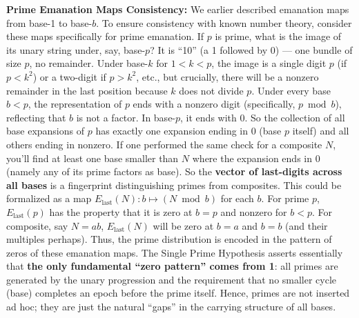 \documentclass{article}
\begin{document}
\textbf{Prime Emanation Maps Consistency:} We earlier described emanation maps from base-1 to base-$b$. To ensure consistency with known number theory, consider these maps specifically for prime emanation. If $p$ is prime, what is the image of its unary string under, say, base-$p$? It is ``10'' (a 1 followed by 0) --- one bundle of size $p$, no remainder. Under base-$k$ for $1<k<p$, the image is a single digit $p$ (if $p<k^2$) or a two-digit if $p>k^2$, etc., but crucially, there will be a nonzero remainder in the last position because $k$ does not divide $p$. Under every base $b<p$, the representation of $p$ ends with a nonzero digit (specifically, $p \bmod b$), reflecting that $b$ is not a factor. In base-$p$, it ends with 0. So the collection of all base expansions of $p$ has exactly one expansion ending in 0 (base $p$ itself) and all others ending in nonzero. If one performed the same check for a composite $N$, you'll find at least one base smaller than $N$ where the expansion ends in 0 (namely any of its prime factors as base). So the \textbf{vector of last-digits across all bases} is a fingerprint distinguishing primes from composites. This could be formalized as a map $E_{\text{last}}(N): b \mapsto (N \bmod b)$ for each $b$. For prime $p$, $E_{\text{last}}(p)$ has the property that it is zero at $b=p$ and nonzero for $b < p$. For composite, say $N=ab$, $E_{\text{last}}(N)$ will be zero at $b=a$ and $b=b$ (and their multiples perhaps). Thus, the prime distribution is encoded in the pattern of zeros of these emanation maps. The Single Prime Hypothesis asserts essentially that \textbf{the only fundamental ``zero pattern'' comes from 1}: all primes are generated by the unary progression and the requirement that no smaller cycle (base) completes an epoch before the prime itself. Hence, primes are not inserted ad hoc; they are just the natural ``gaps'' in the carrying structure of all bases.

\medskip
\end{document}
